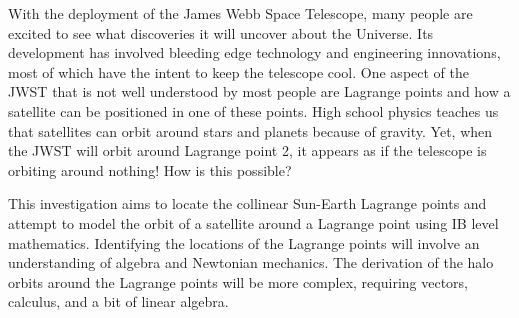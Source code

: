With the deployment of the James Webb Space Telescope, many people are excited to see what discoveries it will uncover about the Universe.
Its development has involved bleeding edge technology and engineering innovations, most of which have the intent to keep the telescope cool. %
One aspect of the JWST that is not well understood by most people are Lagrange points and how a satellite can be positioned in one of these points.
High school physics teaches us that satellites can orbit around stars and planets because of gravity.
Yet, when the JWST will orbit around Lagrange point 2, it appears as if the telescope is orbiting around nothing!
How is this possible?

This investigation aims to locate the collinear Sun-Earth Lagrange points and attempt to model the orbit of a satellite around a Lagrange point using IB level mathematics.
Identifying the locations of the Lagrange points will involve an understanding of algebra and Newtonian mechanics.
The derivation of the halo orbits around the Lagrange points will be more complex, requiring vectors, calculus, and a bit of linear algebra.